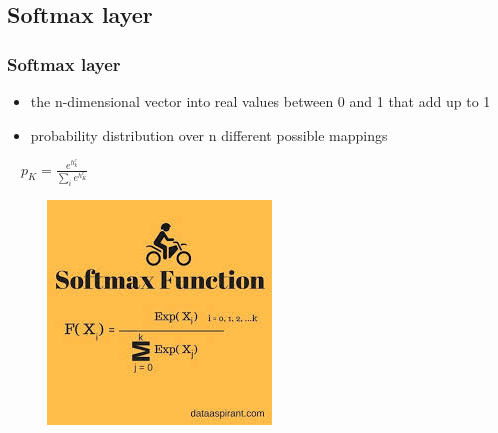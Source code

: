 \documentclass{beamer}
\begin{document}
\subsection{Softmax layer}
\begin{frame}
	\frametitle{Softmax layer}
	\begin{itemize}
		\item {the n-dimensional vector into real values between 0
			and 1 that add up to 1}
		\item {probability distribution over n different possible mappings}
	\end{itemize}
	$\quad p_K=\frac{e^{h_k^c}}{\sum_ie^{h_K^c}}$
	
\begin{figure}
	\centering
	\includegraphics[width=0.3\linewidth]{../Images/softmaxLayer}
	\label{fig:softmaxlayer}
\end{figure}
\end{frame}
\end{document}
